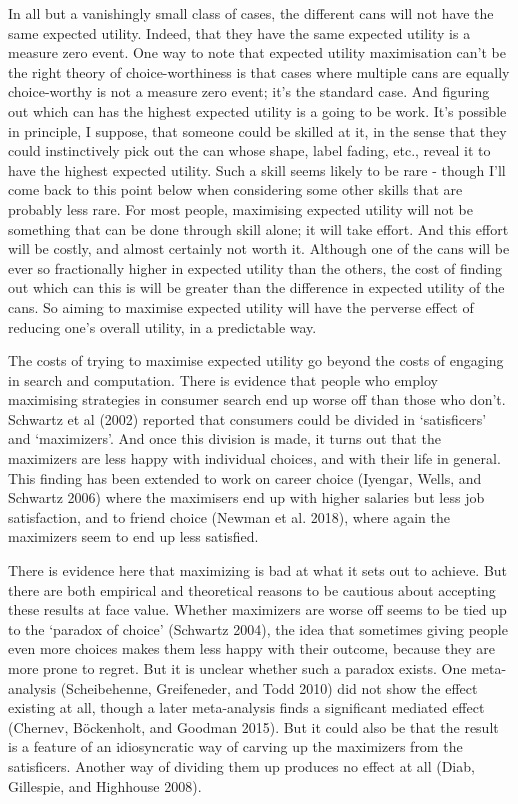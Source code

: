 \documentclass[
  12pt,
]{article}
\begin{document}
In all but a vanishingly small class of cases, the different cans will not have the same expected utility. Indeed, that they have the same expected utility is a measure zero event. One way to note that expected utility maximisation can't be the right theory of choice-worthiness is that cases where multiple cans are equally choice-worthy is not a measure zero event; it's the standard case. And figuring out which can has the highest expected utility is a going to be work. It's possible in principle, I suppose, that someone could be skilled at it, in the sense that they could instinctively pick out the can whose shape, label fading, etc., reveal it to have the highest expected utility. Such a skill seems likely to be rare - though I'll come back to this point below when considering some other skills that are probably less rare. For most people, maximising expected utility will not be something that can be done through skill alone; it will take effort. And this effort will be costly, and almost certainly not worth it. Although one of the cans will be ever so fractionally higher in expected utility than the others, the cost of finding out which can this is will be greater than the difference in expected utility of the cans. So aiming to maximise expected utility will have the perverse effect of reducing one's overall utility, in a predictable way.

The costs of trying to maximise expected utility go beyond the costs of engaging in search and computation. There is evidence that people who employ maximising strategies in consumer search end up worse off than those who don't. Schwartz et al (2002) reported that consumers could be divided in `satisficers' and `maximizers'. And once this division is made, it turns out that the maximizers are less happy with individual choices, and with their life in general. This finding has been extended to work on career choice (Iyengar, Wells, and Schwartz 2006) where the maximisers end up with higher salaries but less job satisfaction, and to friend choice (Newman et al. 2018), where again the maximizers seem to end up less satisfied.

There is evidence here that maximizing is bad at what it sets out to achieve. But there are both empirical and theoretical reasons to be cautious about accepting these results at face value. Whether maximizers are worse off seems to be tied up to the `paradox of choice' (Schwartz 2004), the idea that sometimes giving people even more choices makes them less happy with their outcome, because they are more prone to regret. But it is unclear whether such a paradox exists. One meta-analysis (Scheibehenne, Greifeneder, and Todd 2010) did not show the effect existing at all, though a later meta-analysis finds a significant mediated effect (Chernev, Böckenholt, and Goodman 2015). But it could also be that the result is a feature of an idiosyncratic way of carving up the maximizers from the satisficers. Another way of dividing them up produces no effect at all (Diab, Gillespie, and Highhouse 2008).
\end{document}
